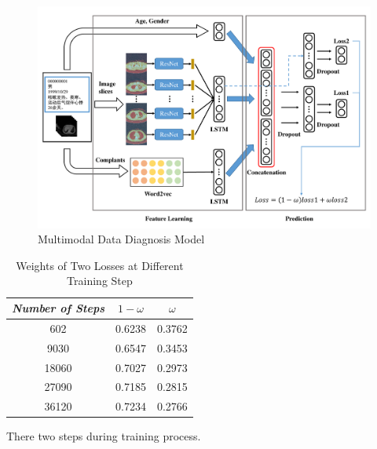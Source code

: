 \documentclass[runningheads]{llncs}
\begin{document}
\begin{figure}[t]
    \centerline{\includegraphics[width=130mm]{MMDD.pdf}}
    \vspace{-0cm}
    \caption{Multimodal Data Diagnosis Model}
    \vspace{-0cm}
    \label{MMDD}
    \end{figure}

\begin{table}[t]
    \vspace{-0cm}
    \caption{Weights of Two Losses at Different Training Step}
    \vspace{-0cm}
    \begin{center}
    \begin{tabular}{|c|c|c|}
    \hline
    \textbf{\textit{Number of Steps}} & \textbf{\textit{$1 - \omega$}} & \textbf{\textit{$\omega$}}\\
    \hline
    602 &0.6238 & 0.3762  \\
    9030 &0.6547 & 0.3453  \\
    18060 &0.7027 & 0.2973  \\
    27090 &0.7185 & 0.2815  \\
    36120 &0.7234 & 0.2766  \\

    \hline
    \end{tabular}
    \vspace{-0cm}
    \label{weights}
    \end{center}
    \vspace{-0cm}
    \end{table}

There two steps during training process.
\end{document}
